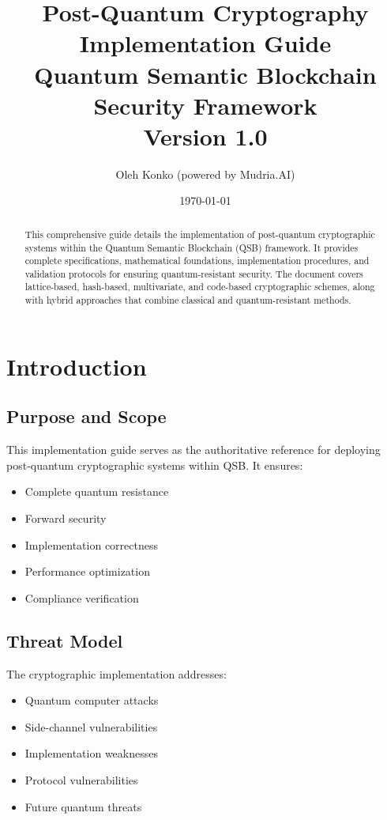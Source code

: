 \documentclass[12pt]{article}
\title{Post-Quantum Cryptography Implementation Guide\\
\large{Quantum Semantic Blockchain Security Framework}\\
\large{Version 1.0}}
\author{Oleh Konko (powered by Mudria.AI)}
\date{\today}
\begin{document}
\maketitle

\begin{abstract}
This comprehensive guide details the implementation of post-quantum cryptographic systems within the Quantum Semantic Blockchain (QSB) framework. It provides complete specifications, mathematical foundations, implementation procedures, and validation protocols for ensuring quantum-resistant security. The document covers lattice-based, hash-based, multivariate, and code-based cryptographic schemes, along with hybrid approaches that combine classical and quantum-resistant methods.
\end{abstract}

\tableofcontents

\section{Introduction}

\subsection{Purpose and Scope}

This implementation guide serves as the authoritative reference for deploying post-quantum cryptographic systems within QSB. It ensures:

\begin{itemize}
\item Complete quantum resistance
\item Forward security
\item Implementation correctness
\item Performance optimization
\item Compliance verification
\end{itemize}

\subsection{Threat Model}

The cryptographic implementation addresses:

\begin{itemize}
\item Quantum computer attacks
\item Side-channel vulnerabilities
\item Implementation weaknesses
\item Protocol vulnerabilities
\item Future quantum threats
\end{itemize}
\end{document}
